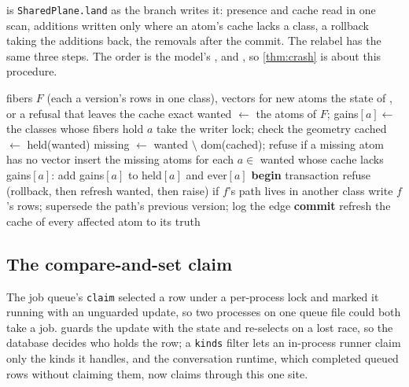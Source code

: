 \documentclass[11pt]{article}
\theoremstyle{plain}
\theoremstyle{definition}
\theoremstyle{remark}
\begin{document}
 is \texttt{SharedPlane.land} as the branch writes it: presence and cache read in
one scan, additions written only where an atom's cache lacks a class, a rollback taking the
additions back, the removals after the commit. The relabel has the same three steps. The order is
the model's ,  and , so \cref{thm:crash} is about
this procedure.

\begin{algorithm}[htbp]
\caption{A landing with the cache's additions before its transaction (\texttt{core/stores/plane.py}).}\label{alg:land}
\begin{algorithmic}[1]
\Require fibers $F$ (each a version's rows in one class), vectors for new atoms
\Ensure the state of , or a refusal that leaves the cache exact
\State wanted $\gets$ the atoms of $F$; gains$[a] \gets$ the classes whose fibers hold $a$
\State take the writer lock; check the geometry
\State cached $\gets$ held(wanted) 
\State missing $\gets$ wanted $\setminus$ dom(cached); refuse if a missing atom has no vector
\State insert the missing atoms 
\State for each $a \in$ wanted whose cache lacks gains$[a]$: add gains$[a]$ to held$[a]$ and ever$[a]$
\State \textbf{begin} transaction
  \State refuse (rollback, then refresh wanted, then raise) if $f$'s path lives in another class
  \State write $f$'s rows; supersede the path's previous version; log the edge
\EndFor
\State \textbf{commit}
\State refresh the cache of every affected atom to its truth 
\end{algorithmic}
\end{algorithm}

\subsection{The compare-and-set claim}

The job queue's \texttt{claim} selected a row under a per-process lock and marked it running with
an unguarded update, so two processes on one queue file could both take a job.
 guards the update with the state and re-selects on a lost race, so the database
decides who holds the row; a \texttt{kinds} filter lets an in-process runner claim only the kinds
it handles, and the conversation runtime, which completed queued rows without claiming them, now
claims through this one site.
\end{document}
